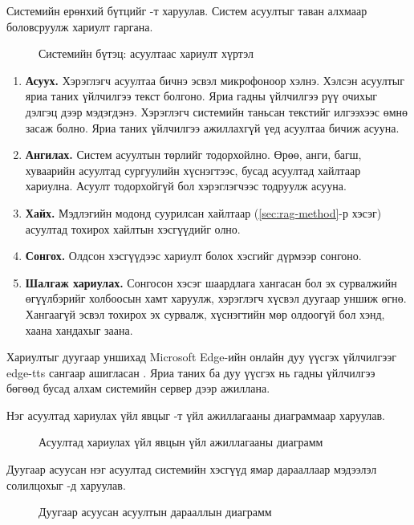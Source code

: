 Системийн ерөнхий бүтцийг -т харуулав. Систем асуултыг таван алхмаар боловсруулж хариулт гаргана.

\begin{figure}[ht]
\centering
{}
\caption{Системийн бүтэц: асуултаас хариулт хүртэл}
\label{fig:system}
\end{figure}

\begin{enumerate}
    \item \textbf{Асуух.} Хэрэглэгч асуултаа бичнэ эсвэл микрофоноор хэлнэ. Хэлсэн асуултыг яриа таних үйлчилгээ текст болгоно. Яриа гадны үйлчилгээ рүү очихыг дэлгэц дээр мэдэгдэнэ. Хэрэглэгч системийн таньсан текстийг илгээхээс өмнө засаж болно. Яриа таних үйлчилгээ ажиллахгүй үед асуултаа бичиж асууна.
    \item \textbf{Ангилах.} Систем асуултын төрлийг тодорхойлно. Өрөө, анги, багш, хуваарийн асуултад сургуулийн хүснэгтээс, бусад асуултад хайлтаар хариулна. Асуулт тодорхойгүй бол хэрэглэгчээс тодруулж асууна.
    \item \textbf{Хайх.} Мэдлэгийн модонд суурилсан хайлтаар (\ref{sec:rag-method}-р хэсэг) асуултад тохирох хайлтын хэсгүүдийг олно.
    \item \textbf{Сонгох.} Олдсон хэсгүүдээс хариулт болох хэсгийг дүрмээр сонгоно.
    \item \textbf{Шалгаж хариулах.} Сонгосон хэсэг шаардлага хангасан бол эх сурвалжийн өгүүлбэрийг холбоосын хамт харуулж, хэрэглэгч хүсвэл дуугаар уншиж өгнө. Хангаагүй эсвэл тохирох эх сурвалж, хүснэгтийн мөр олдоогүй бол хэнд, хаана хандахыг заана.
\end{enumerate}

Хариултыг дуугаар уншихад Microsoft Edge-ийн онлайн дуу үүсгэх үйлчилгээг edge-tts сангаар ашигласан \cite{edge_tts}. Яриа таних ба дуу үүсгэх нь гадны үйлчилгээ бөгөөд бусад алхам системийн сервер дээр ажиллана.

Нэг асуултад хариулах үйл явцыг -т үйл ажиллагааны диаграммаар харуулав.

\begin{figure}[p]
\centering
{}
\caption{Асуултад хариулах үйл явцын үйл ажиллагааны диаграмм}
\label{fig:activity}
\end{figure}

Дуугаар асуусан нэг асуултад системийн хэсгүүд ямар дарааллаар мэдээлэл солилцохыг -д харуулав.

\begin{figure}[p]
\centering
{}
\caption{Дуугаар асуусан асуултын дарааллын диаграмм}
\label{fig:sequence}
\end{figure}

